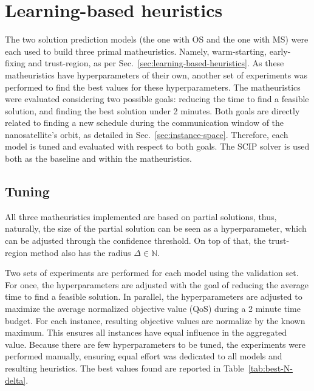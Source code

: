 \section{Learning-based heuristics}

The two solution prediction models (the one with OS and the one with MS) were each used to build three primal matheuristics.
Namely, warm-starting, early-fixing and trust-region, as per Sec.~\ref{sec:learning-based-heuristics}.
As these matheuristics have hyperparameters of their own, another set of experiments was performed to find the best values for these hyperparameters.
The matheuristics were evaluated considering two possible goals: reducing the time to find a feasible solution, and finding the best solution under 2 minutes.
Both goals are directly related to finding a new schedule during the communication window of the nanosatellite's orbit, as detailed in Sec.~\ref{sec:instance-space}.
Therefore, each model is tuned and evaluated with respect to both goals.
The SCIP solver is used both as the baseline and within the matheuristics.

\subsection{Tuning}

All three matheuristics implemented are based on partial solutions, thus, naturally, the size of the partial solution can be seen as a hyperparameter, which can be adjusted through the confidence threshold.
On top of that, the trust-region method also has the radius $\Delta\in \mathbb{N}$.

Two sets of experiments are performed for each model using the validation set.
For once, the hyperparameters are adjusted with the goal of reducing the average time to find a feasible solution.
In parallel, the hyperparameters are adjusted to maximize the average normalized objective value (QoS) during a 2 minute time budget.
For each instance, resulting objective values are normalize by the known maximum.
This ensures all instances have equal influence in the aggregated value.
Because there are few hyperparameters to be tuned, the experiments were performed manually, ensuring equal effort was dedicated to all models and resulting heuristics.
The best values found are reported in Table~\ref{tab:best-N-delta}.

